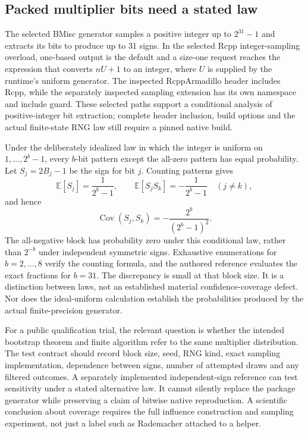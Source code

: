 \subsection{Packed multiplier bits need a stated law}

The selected BMisc generator samples a positive integer up to $2^{31}-1$ and extracts its bits to produce up to 31 signs. In the selected Rcpp integer-sampling overload, one-based output is the default and a size-one request reaches the expression that converts $nU+1$ to an integer, where $U$ is supplied by the runtime's uniform generator. The inspected RcppArmadillo header includes Rcpp, while the separately inspected sampling extension has its own namespace and include guard. These selected paths support a conditional analysis of positive-integer bit extraction; complete header inclusion, build options and the actual finite-state RNG law still require a pinned native build.\citep{exec29_panel_inference_sources,exec29_panel_runtime_sources}

Under the deliberately idealized law in which the integer is uniform on $1,\ldots,2^b-1$, every $b$-bit pattern except the all-zero pattern has equal probability. Let $S_j=2B_j-1$ be the sign for bit $j$. Counting patterns gives
\[
 \mathbb E[S_j]=\frac{1}{2^b-1},\qquad
 \mathbb E[S_jS_k]=-\frac{1}{2^b-1}\quad(j\ne k),
\]
and hence
\[
 \operatorname{Cov}(S_j,S_k)=-\frac{2^b}{(2^b-1)^2}.
\]
The all-negative block has probability zero under this conditional law, rather than $2^{-b}$ under independent symmetric signs. Exhaustive enumerations for $b=2,\ldots,8$ verify the counting formula, and the authored reference evaluates the exact fractions for $b=31$. The discrepancy is small at that block size. It is a distinction between laws, not an established material confidence-coverage defect. Nor does the ideal-uniform calculation establish the probabilities produced by the actual finite-precision generator.\citep{exec29_panel_runtime_reference}

For a public qualification trial, the relevant question is whether the intended bootstrap theorem and finite algorithm refer to the same multiplier distribution. The test contract should record block size, seed, RNG kind, exact sampling implementation, dependence between signs, number of attempted draws and any filtered outcomes. A separately implemented independent-sign reference can test sensitivity under a stated alternative law. It cannot silently replace the package generator while preserving a claim of bitwise native reproduction. A scientific conclusion about coverage requires the full influence construction and sampling experiment, not just a label such as Rademacher attached to a helper.\citep{exec29_panel_runtime_sources,exec29_panel_runtime_reference}

